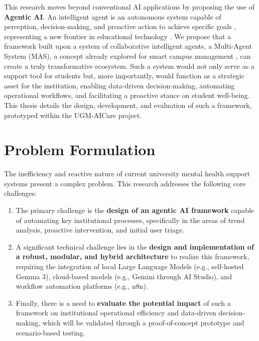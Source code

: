 This research moves beyond conventional AI applications by proposing the use of \textbf{Agentic AI}. An intelligent agent is an autonomous system capable of perception, decision-making, and proactive action to achieve specific goals \cite{FIND_CITATION_PLEASE}, representing a new frontier in educational technology \cite{FIND_CITATION_PLEASE}. We propose that a framework built upon a system of collaborative intelligent agents, a Multi-Agent System (MAS), a concept already explored for smart campus management \cite{FIND_CITATION_PLEASE}, can create a truly transformative ecosystem. Such a system would not only serve as a support tool for students but, more importantly, would function as a strategic asset for the institution, enabling data-driven decision-making, automating operational workflows, and facilitating a proactive stance on student well-being. This thesis details the design, development, and evaluation of such a framework, prototyped within the UGM-AICare project.



\section{Problem Formulation}
\label{sec:problem_formulation}

The inefficiency and reactive nature of current university mental health support systems present a complex problem. This research addresses the following core challenges:

\begin{enumerate}
    \item The primary challenge is the \textbf{design of an agentic AI framework} capable of automating key institutional processes, specifically in the areas of trend analysis, proactive intervention, and initial user triage.
    \item A significant technical challenge lies in the \textbf{design and implementation of a robust, modular, and hybrid architecture} to realize this framework, requiring the integration of local Large Language Models (e.g., self-hosted Gemma 3), cloud-based models (e.g., Gemini through AI Studio), and workflow automation platforms (e.g., n8n).
    \item Finally, there is a need to \textbf{evaluate the potential impact} of such a framework on institutional operational efficiency and data-driven decision-making, which will be validated through a proof-of-concept prototype and scenario-based testing.
\end{enumerate}

